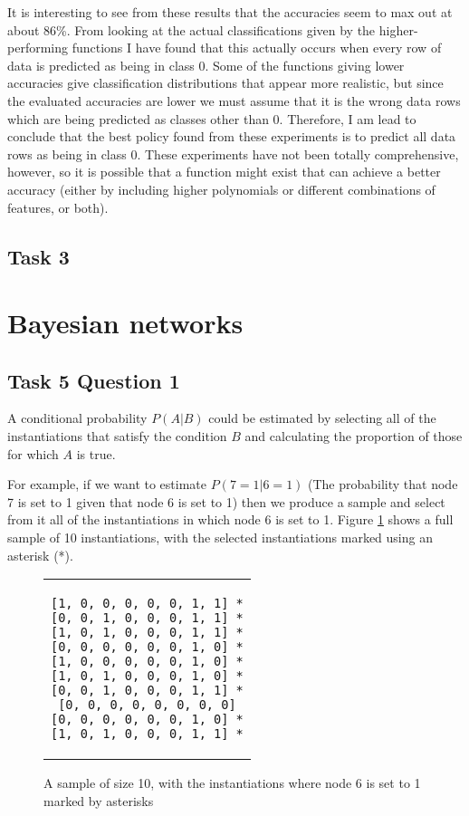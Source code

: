 \documentclass[a4paper,11pt]{article}
\begin{document}
It is interesting to see from these results that the accuracies seem to max out at about 86\%.  From looking at the actual classifications given by the higher-performing functions I have found that this actually occurs when every row of data is predicted as being in class 0.  Some of the functions giving lower accuracies give classification distributions that appear more realistic, but since the evaluated accuracies are lower we must assume that it is the wrong data rows which are being predicted as classes other than 0.  Therefore, I am lead to conclude that the best policy found from these experiments is to predict all data rows as being in class 0.  These experiments have not been totally comprehensive, however, so it is possible that a function might exist that can achieve a better accuracy (either by including higher polynomials or different combinations of features, or both).

\subsection{Task 3}

\section{Bayesian networks}

\subsection{Task 5 Question 1}

A conditional probability $P(A|B)$ could be estimated by selecting all of the instantiations that satisfy the condition $B$ and calculating the proportion of those for which $A$ is true.

For example, if we want to estimate $P(7=1|6=1)$ (The probability that node 7 is set to 1 given that node 6 is set to 1) then we produce a sample and select from it all of the instantiations in which node 6 is set to 1.  Figure \ref{sample1} shows a full sample of 10 instantiations, with the selected instantiations marked using an asterisk (*).

\begin{figure}[h]
	\centering
	\lstset{basicstyle=\ttfamily}
	\begin{tabular}{c}
	\begin{lstlisting}
[1, 0, 0, 0, 0, 0, 1, 1] *
[0, 0, 1, 0, 0, 0, 1, 1] *
[1, 0, 1, 0, 0, 0, 1, 1] *
[0, 0, 0, 0, 0, 0, 1, 0] *
[1, 0, 0, 0, 0, 0, 1, 0] *
[1, 0, 1, 0, 0, 0, 1, 0] *
[0, 0, 1, 0, 0, 0, 1, 1] *
[0, 0, 0, 0, 0, 0, 0, 0]
[0, 0, 0, 0, 0, 0, 1, 0] *
[1, 0, 1, 0, 0, 0, 1, 1] *
	\end{lstlisting}
	\end{tabular}
	\caption{A sample of size 10, with the instantiations where node 6 is set to 1 marked by asterisks}
	\label{sample1}
\end{figure}
\end{document}
